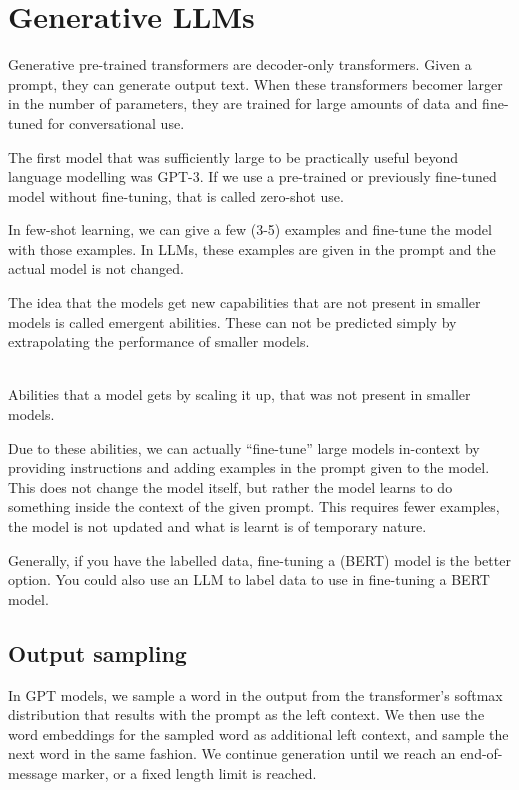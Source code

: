\section{Generative LLMs}

Generative pre-trained transformers are decoder-only transformers.
Given a prompt, they can generate output text. When these transformers
becomer larger in the number of parameters, they are trained for large amounts
of data and fine-tuned for conversational use.

The first model that was sufficiently large to be practically useful
beyond language
modelling was GPT-3. If we use a pre-trained or previously fine-tuned
model without
fine-tuning, that is called zero-shot use.

In few-shot learning, we can give a few (3-5) examples and fine-tune the
model with those examples. In LLMs, these examples are given in the prompt
and the actual model is not changed.

The idea that the models get new capabilities that are not present in
smaller models is called emergent abilities. These can not be predicted
simply by extrapolating the performance of smaller models.

\begin{definition}
  ~\\
  Abilities that a model gets by scaling it up, that was not present
  in smaller models.
\end{definition}

Due to these abilities, we can actually ``fine-tune'' large models in-context
by providing instructions and adding examples in the prompt given to the model.
This does not change the model itself, but rather the model learns to
do something
inside the context of the given prompt. This requires fewer examples,
the model is not
updated and what is learnt is of temporary nature.

Generally, if you have the labelled data, fine-tuning a (BERT) model
is the better
option. You could also use an LLM to label data to use in fine-tuning
a BERT model.

\subsection{Output sampling}

In GPT models, we sample a word in the output from the transformer's
softmax distribution
that results with the prompt as the left context. We then use the
word embeddings
for the sampled word as additional left context, and sample the next word in the
same fashion. We continue generation until we reach an end-of-message
marker, or a
fixed length limit is reached.

